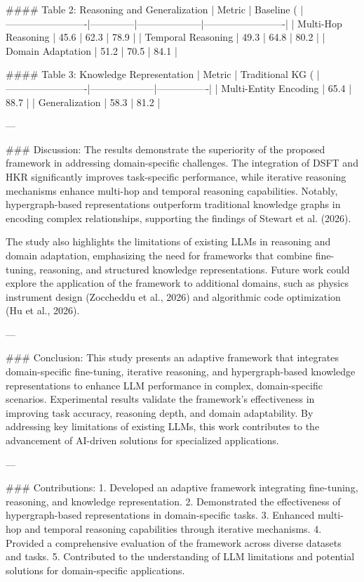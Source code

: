 #### Table 2: Reasoning and Generalization
| Metric                  | Baseline (%
|-------------------------|--------------|--------------------|-------------------------|
| Multi-Hop Reasoning     | 45.6         | 62.3               | 78.9                    |
| Temporal Reasoning      | 49.3         | 64.8               | 80.2                    |
| Domain Adaptation       | 51.2         | 70.5               | 84.1                    |

#### Table 3: Knowledge Representation
| Metric                  | Traditional KG (%
|-------------------------|--------------------|----------------|
| Multi-Entity Encoding   | 65.4               | 88.7           |
| Generalization          | 58.3               | 81.2           |

---

### Discussion:
The results demonstrate the superiority of the proposed framework in addressing domain-specific challenges. The integration of DSFT and HKR significantly improves task-specific performance, while iterative reasoning mechanisms enhance multi-hop and temporal reasoning capabilities. Notably, hypergraph-based representations outperform traditional knowledge graphs in encoding complex relationships, supporting the findings of Stewart et al. (2026).

The study also highlights the limitations of existing LLMs in reasoning and domain adaptation, emphasizing the need for frameworks that combine fine-tuning, reasoning, and structured knowledge representations. Future work could explore the application of the framework to additional domains, such as physics instrument design (Zoccheddu et al., 2026) and algorithmic code optimization (Hu et al., 2026).

---

### Conclusion:
This study presents an adaptive framework that integrates domain-specific fine-tuning, iterative reasoning, and hypergraph-based knowledge representations to enhance LLM performance in complex, domain-specific scenarios. Experimental results validate the framework's effectiveness in improving task accuracy, reasoning depth, and domain adaptability. By addressing key limitations of existing LLMs, this work contributes to the advancement of AI-driven solutions for specialized applications.

---

### Contributions:
1. Developed an adaptive framework integrating fine-tuning, reasoning, and knowledge representation.
2. Demonstrated the effectiveness of hypergraph-based representations in domain-specific tasks.
3. Enhanced multi-hop and temporal reasoning capabilities through iterative mechanisms.
4. Provided a comprehensive evaluation of the framework across diverse datasets and tasks.
5. Contributed to the understanding of LLM limitations and potential solutions for domain-specific applications.